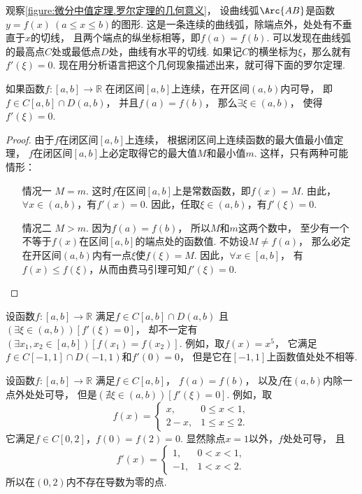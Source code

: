 观察\cref{figure:微分中值定理.罗尔定理的几何意义}，
设曲线弧\(\Arc{AB}\)是函数\(y=f(x)\ (a\leq x\leq b)\)的图形.
这是一条连续的曲线弧，除端点外，处处有不垂直于\(x\)的切线，
且两个端点的纵坐标相等，即\(f(a)=f(b)\).
可以发现在曲线弧的最高点\(C\)处或最低点\(D\)处，曲线有水平的切线.
如果记\(C\)的横坐标为\(\xi\)，那么就有\(f'(\xi)=0\).
现在用分析语言把这个几何现象描述出来，就可得下面的罗尔定理.

\begin{theorem}[罗尔定理]\label{theorem:微分中值定理.罗尔定理}
如果函数\(f\colon [a,b]\to\mathbb{R}\)
在闭区间\([a,b]\)上连续，在开区间\((a,b)\)内可导，
即\(f \in C[a,b] \cap D(a,b)\)，
并且\(f(a)=f(b)\)，
那么\(\exists \xi \in (a,b)\)，
使得\(f'(\xi) = 0\).
\begin{proof}
由于\(f\)在闭区间\([a,b]\)上连续，
根据闭区间上连续函数的最大值最小值定理，
\(f\)在闭区间\([a,b]\)上必定取得它的最大值\(M\)和最小值\(m\).
这样，只有两种可能情形：
\begin{enumerate}
	\item[情况一] \(M=m\).
		这时\(f\)在区间\([a,b]\)上是常数函数，即\(f(x)=M\).
		由此，\(\forall x\in(a,b)\)，有\(f'(x)=0\).
		因此，任取\(\xi\in(a,b)\)，有\(f'(\xi)=0\).

	\item[情况二] \(M>m\).
		因为\(f(a)=f(b)\)，
		所以\(M\)和\(m\)这两个数中，
		至少有一个不等于\(f(x)\)在区间\([a,b]\)的端点处的函数值.
		不妨设\(M \neq f(a)\)，
		那么必定在开区间\((a,b)\)内有一点\(\xi\)使\(f(\xi)=M\).
		因此，\(\forall x\in[a,b]\)，
		有\(f(x) \leq f(\xi)\)，从而由费马引理可知\(f'(\xi)=0\).
		\qedhere
\end{enumerate}
\end{proof}
\end{theorem}

\begin{example}
设函数\(f\colon[a,b]\to\mathbb{R}\)
满足\(f\in C[a,b]\cap D(a,b)\)
且\((\exists\xi\in(a,b))[f'(\xi)=0]\)，
却不一定有\((\exists x_1,x_2\in[a,b])[f(x_1)=f(x_2)]\).
例如，取\(f(x)=x^5\)，
它满足\(f\in C[-1,1]\cap D(-1,1)\)和\(f'(0)=0\)，
但是它在\([-1,1]\)上函数值处处不相等.
\end{example}

\begin{example}
设函数\(f\colon[a,b]\to\mathbb{R}\)
满足\(f\in C[a,b]\)，
\(f(a)=f(b)\)，
以及\(f\)在\((a,b)\)内除一点外处处可导，
但是\((\nexists\xi\in(a,b))[f'(\xi)=0]\).
例如，取\[
	f(x) = \left\{ \begin{array}{cl}
		x, & 0\leq x<1, \\
		2-x, & 1\leq x\leq 2.
	\end{array} \right.
\]
它满足\(f\in C[0,2]\)，\(f(0)=f(2)=0\).
显然除点\(x=1\)以外，\(f\)处处可导，
且\[
	f'(x) = \left\{ \begin{array}{rl}
		1, & 0<x<1, \\
		-1, & 1<x<2.
	\end{array} \right.
\]
所以在\((0,2)\)内不存在导数为零的点.
\end{example}

